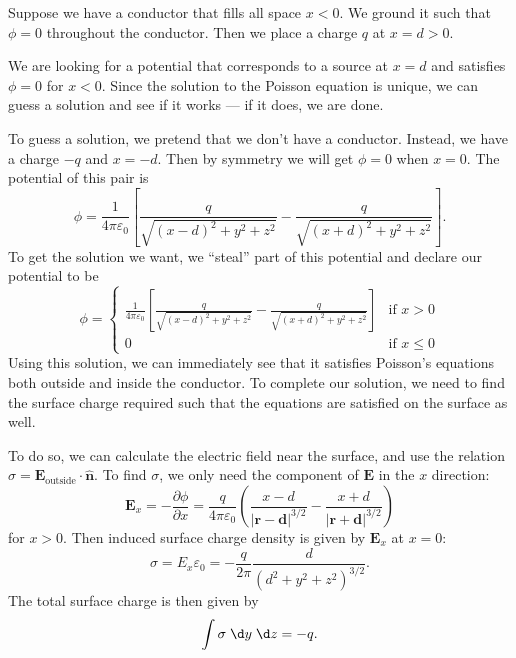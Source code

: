 \documentclass[a4paper]{article}
\begin{document}
\begin{eg}
  Suppose we have a conductor that fills all space $x < 0$. We ground it such that $\phi = 0$ throughout the conductor. Then we place a charge $q$ at $x = d > 0$.
  \begin{center}
  \end{center}
  We are looking for a potential that corresponds to a source at $x = d$ and satisfies $\phi = 0$ for $x < 0$. Since the solution to the Poisson equation is unique, we can guess a solution and see if it works --- if it does, we are done.

  To guess a solution, we pretend that we don't have a conductor. Instead, we have a charge $-q$ and $x = -d$. Then by symmetry we will get $\phi = 0$ when $x = 0$. The potential of this pair is
  \[
    \phi = \frac{1}{4\pi\varepsilon_0}\left[\frac{q}{\sqrt{(x - d)^2 + y^2 + z^2}} - \frac{q}{\sqrt{(x + d)^2 + y^2 + z^2}}\right].
  \]
  To get the solution we want, we ``steal'' part of this potential and declare our potential to be
  \[
    \phi =
    \begin{cases}
      \frac{1}{4\pi\varepsilon_0}\left[\frac{q}{\sqrt{(x - d)^2 + y^2 + z^2}} - \frac{q}{\sqrt{(x + d)^2 + y^2 + z^2}}\right] & \text{if }x > 0\\
    0  & \text{if }x \leq 0
    \end{cases}
  \]
  Using this solution, we can immediately see that it satisfies Poisson's equations both outside and inside the conductor. To complete our solution, we need to find the surface charge required such that the equations are satisfied on the surface as well.

  To do so, we can calculate the electric field near the surface, and use the relation $\sigma = \mathbf{E}_\text{outside}\cdot \hat{\mathbf{n}}$. To find $\sigma$, we only need the component of $\mathbf{E}$ in the $x$ direction:
  \[
    \mathbf{E}_x = -\frac{\partial \phi}{\partial x} = \frac{q}{4\pi\varepsilon_0}\left(\frac{x - d}{|\mathbf{r} - \mathbf{d}|^{3/2}} - \frac{x + d}{|\mathbf{r} + \mathbf{d}|^{3/2}}\right)
  \]
  for $x > 0$. Then induced surface charge density is given by $\mathbf{E}_x$ at $x = 0$:
  \[
    \sigma = E_x\varepsilon_0 = -\frac{q}{2\pi}\frac{d}{(d^2 + y^2 + z^2)^{3/2}}.
  \]
  The total surface charge is then given by
  \[
    \int \sigma \;\d y\;\d z  = -q.
  \]
\end{eg}
\end{document}
